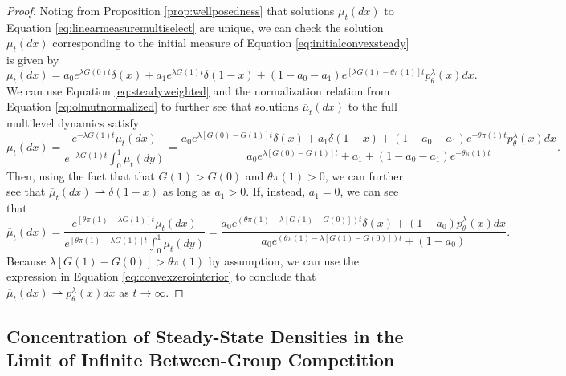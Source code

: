 \documentclass[11pt]{article}
\numberwithin{equation}{section}
\newcommand{\ol}{\overline}
\begin{document}
{ \begin{proof} 
Noting from Proposition \ref{prop:wellposedness} that solutions $\mu_t(dx)$ to Equation \eqref{eq:linearmeasuremultiselect} are unique, we can check the solution $\mu_t(dx)$ corresponding to the initial measure of Equation \eqref{eq:initialconvexsteady} is given by
  \begin{equation} \label{eq:steadyweighted}
      \mu_t(dx) = a_0 e^{\lambda G(0) t} \delta(x) + a_1 e^{\lambda G(1) t} \delta(1-x) + \left( 1 - a_0 - a_1\right) e^{\left[\lambda G(1) - \theta \pi(1) \right] t} p^{\lambda}_{\theta}(x) dx.
  \end{equation}
We can use Equation \eqref{eq:steadyweighted} and the normalization relation from Equation \eqref{eq:olmutnormalized} to further see that solutions $\ol{\mu}_t(dx)$ to the full multilevel dynamics satisfy
 \begin{equation}
     \ol{\mu}_t(dx) = \frac{e^{-\lambda G(1) t} \mu_t(dx)}{e^{-\lambda G(1) t} \int_0^1 \mu_t(dy)} = \frac{a_0 e^{\lambda \left[G(0) - G(1) \right] t} \delta(x) + a_1 \delta(1-x) + \left( 1 - a_0 - a_1\right) e^{ - \theta \pi(1) t} p^{\lambda}_{\theta}(x) dx}{a_0 e^{\lambda\left[ G(0) - G(1) \right] t } + a_1 + \left( 1 - a_0 - a_1\right) e^{ - \theta \pi(1) t}}.
 \end{equation}
 Then, using the fact that that $G(1) > G(0)$ and $\theta \pi(1) > 0$, we can further see that $\ol{\mu}_t(dx) \rightharpoonup \delta(1-x)$ as long as $a_1 > 0$. If, instead, $a_1 = 0$, we can see that 
 \begin{equation} \label{eq:convexzerointerior} 
  \ol{\mu}_t(dx) = \frac{e^{\left[ \theta \pi(1) - \lambda G(1) \right] t } \mu_t(dx) }{e^{\left[ \theta \pi(1) - \lambda G(1) \right] t } \int_0^1 \mu_t(dy)} = \frac{a_0 e^{\left(\theta \pi(1) - \lambda \left[ G(1) - G(0)\right] \right) t } \delta(x) + \left( 1 - a_0 \right) p^{\lambda}_{\theta}(x) dx}{a_0 e^{\left(\theta \pi(1) - \lambda \left[ G(1) - G(0)\right] \right) t } + \left( 1 - a_0 \right) }.
 \end{equation}
 Because $\lambda \left[ G(1) - G(0) \right] > \theta \pi(1)$ by assumption, we can use the expression in Equation \eqref{eq:convexzerointerior} to conclude that $\ol{\mu}_t(dx) \rightharpoonup p^{\lambda}_{\theta}(x) dx$ as $ t \to \infty$.
 \end{proof}



\subsection{Concentration of Steady-State Densities in the Limit of Infinite Between-Group Competition}
     \label{sec:steadypropconcentration}

}
\end{document}

